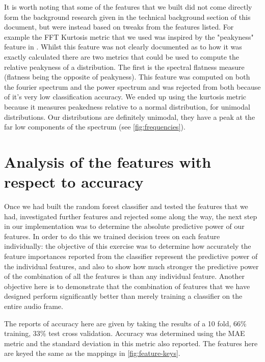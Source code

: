 \documentclass[ %
                    author={Sam Phippen},
                supervisor={Dr. Rafal Bogacz},
                     title={Real time voice activity detectors in noisy personal computing environments},
                  subtitle={},
                    degree={MEng},
                      year={2012} ]{thesis}
\begin{document}
It is worth noting that some of the features that we built did not come
directly form the background research given in the technical background section
of this document, but were instead based on tweaks from the features listed.
For example the FFT Kurtosis metric that we used was inspired by the
"peakyness" feature in \cite{shin}. Whilst this feature was not clearly
documented as to how it was exactly calculated there are two metrics that could
be used to compute the relative peakyness of a distribution. The first is the
spectral flatness measure (flatness being the opposite of peakyness). This
feature was computed on both the fourier spectrum and the power spectrum and
was rejected from both because of it's very low classification accuracy. We
ended up using the kurtosis metric because it measures peakedness relative to a
normal distribution, for unimodal distributions.\cite{DeCarlo} Our
distributions are definitely unimodal, they have a peak at the far low components
of the spectrum (see \ref{fig:frequencies}).

\section{Analysis of the features with respect to accuracy}

Once we had built the random forest classifier and tested the features that we
had, investigated further features and rejected some along the way, the next
step in our implementation was to determine the absolute predictive power of
our features. In order to do this we trained decision trees on each feature
individually: the objective of this exercise was to determine how accurately
the feature importances reported from the classifier represent the predictive
power of the individual features, and also to show how much stronger the
predictive power of the combination of all the features is than any individual
feature. Another objective here is to demonstrate that the combination of
features that we have designed perform significantly better than merely
training a classifier on the entire audio frame.

The reports of accuracy here are given by taking the results of a 10 fold, 66\%
training, 33\% test cross validation. Accuracy was determined using the MAE
metric and the standard deviation in this metric also reported. The features
here are keyed the same as the mappings in \ref{fig:feature-keys}.
\end{document}
